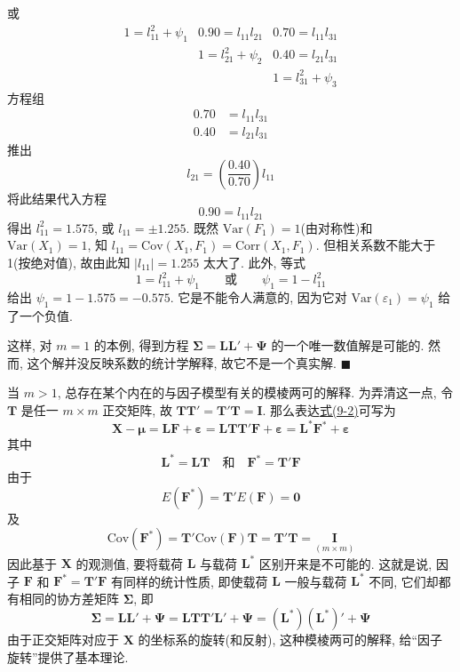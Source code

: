 
或
\[
\begin{array}{ccc}
1=l_{11}^2+\psi_1 & 0.90=l_{11}l_{21} & 0.70=l_{11}l_{31}\\
 & 1=l_{21}^2+\psi_2 & 0.40=l_{21}l_{31}\\
 & & 1=l_{31}^2+\psi_3
\end{array}
\]
方程组
\[
\begin{aligned}
0.70&=l_{11}l_{31}\\
0.40&=l_{21}l_{31}
\end{aligned}
\]
推出
\[
l_{21}=\left(\frac{0.40}{0.70}\right)l_{11}
\]
将此结果代入方程
\[
0.90=l_{11}l_{21}
\]
得出 $l_{11}^2=1.575$, 或 $l_{11}=\pm1.255$. 既然 $\mathrm{Var}(F_1)=1$(由对称性)和 $\mathrm{Var}(X_1)=1$, 知 $l_{11}=\mathrm{Cov}(X_1,F_1)=\mathrm{Corr}(X_1,F_1)$. 但相关系数不能大于 1(按绝对值), 故由此知 $|l_{11}|=1.255$ 太大了. 此外, 等式
\[
1=l_{11}^2+\psi_1\qquad\text{或}\qquad \psi_1=1-l_{11}^2
\]
给出 $\psi_1=1-1.575=-0.575$. 它是不能令人满意的, 因为它对 $\mathrm{Var}(\varepsilon_1)=\psi_1$ 给了一个负值.

这样, 对 $m=1$ 的本例, 得到方程 $\boldsymbol{\Sigma}=\mathbf{L}\mathbf{L}'+\boldsymbol{\Psi}$ 的一个唯一数值解是可能的. 然而, 这个解并没反映系数的统计学解释, 故它不是一个真实解. \hfill$\blacksquare$

当 $m>1$, 总存在某个内在的与因子模型有关的模棱两可的解释. 为弄清这一点, 令 $\mathbf{T}$ 是任一 $m\times m$ 正交矩阵, 故 $\mathbf{T}\mathbf{T}'=\mathbf{T}'\mathbf{T}=\mathbf{I}$. 那么表达\hyperref[eq:9-2]{式(9-2)}可写为
\label{eq:9-7}
\begin{equation}
\mathbf{X}-\boldsymbol{\mu}=\mathbf{L}\mathbf{F}+\boldsymbol{\varepsilon}=\mathbf{L}\mathbf{T}\mathbf{T}'\mathbf{F}+\boldsymbol{\varepsilon}=\mathbf{L}^*\mathbf{F}^*+\boldsymbol{\varepsilon}
\tag{9-7}
\end{equation}
其中
\[
\mathbf{L}^*=\mathbf{L}\mathbf{T}\quad\text{和}\quad \mathbf{F}^*=\mathbf{T}'\mathbf{F}
\]
由于
\[
E(\mathbf{F}^*)=\mathbf{T}'E(\mathbf{F})=\mathbf{0}
\]
及
\[
\mathrm{Cov}(\mathbf{F}^*)=\mathbf{T}'\mathrm{Cov}(\mathbf{F})\mathbf{T}=\mathbf{T}'\mathbf{T}=\underset{(m\times m)}{\mathbf{I}}
\]
因此基于 $\mathbf{X}$ 的观测值, 要将载荷 $\mathbf{L}$ 与载荷 $\mathbf{L}^*$ 区别开来是不可能的. 这就是说, 因子 $\mathbf{F}$ 和 $\mathbf{F}^*=\mathbf{T}'\mathbf{F}$ 有同样的统计性质, 即使载荷 $\mathbf{L}$ 一般与载荷 $\mathbf{L}^*$ 不同, 它们却都有相同的协方差矩阵 $\boldsymbol{\Sigma}$, 即
\label{eq:9-8}
\begin{equation}
\boldsymbol{\Sigma}=\mathbf{L}\mathbf{L}'+\boldsymbol{\Psi}=\mathbf{L}\mathbf{T}\mathbf{T}'\mathbf{L}'+\boldsymbol{\Psi}=(\mathbf{L}^*)(\mathbf{L}^*)'+\boldsymbol{\Psi}
\tag{9-8}
\end{equation}
由于正交矩阵对应于 $\mathbf{X}$ 的坐标系的旋转(和反射), 这种模棱两可的解释, 给“因子旋转”提供了基本理论.

